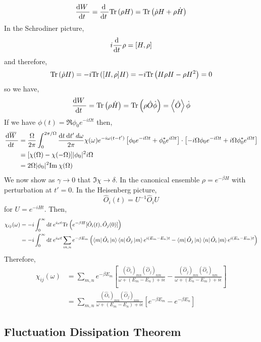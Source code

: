 \documentclass[12pt]{article}
\begin{document}
\[ \frac{\mathrm{d}W \:}{\mathrm{d}t \:} = \frac{\mathrm{d} \:}{\mathrm{d}t \:} \mathrm{Tr} \left( \rho H \right) = \mathrm{Tr} \left( \dot{\rho} H + \rho \dot{H} \right) \]
In the Schrodiner picture,
\[ i \frac{\mathrm{d} \:}{\mathrm{d}t \:} \rho = [H, \rho] \]
and therefore,
\[ \mathrm{Tr} \left( \dot{\rho} H \right) = - i \mathrm{Tr} \left( [H, \rho] H \right) = - i \mathrm{Tr} \left( H \rho H - \rho H^2 \right) = 0 \]
so we have,
\[ \frac{\mathrm{d}W \:}{\mathrm{d}t \:} = \mathrm{Tr} \left( \rho \dot{H} \right) = \mathrm{Tr} \left( \rho \hat{O} \dot{\phi} \right) = \left< \hat{O} \right> \dot{\phi} \]
If we have $\phi(t) = \Re{\phi_0 e^{- i \Omega t}}$ then,
\begin{align*}
\frac{\mathrm{d}\overline{W} \:}{\mathrm{d}t \:} & = \frac{\Omega}{2 \pi} \int_0^{2 \pi / \Omega} \frac{\mathrm{d}t \: \mathrm{d}t' \: d{\omega}}{2 \pi} \chi(\omega) e^{- i \omega (t - t')} \left[ \phi_0 e^{- i \Omega t} + \phi^*_0 e^{i \Omega t} \right] \cdot \left[ - i \Omega \phi_0 e^{- i \Omega t} + i \Omega \phi_0^* e^{i \Omega t} \right] 
\\
& = [ \chi(\Omega) - \chi(-\Omega) ] |\phi_0|^2 i \Omega
\\
& = 2 \Omega |\phi_0|^2 \mathrm{Im} \: \chi(\Omega) 
\end{align*}
We now show as $\gamma \to 0$ that $\Im{\chi} \to \delta$. In the canonical ensemble $\rho = e^{-\beta H}$ with perturbation at $t' = 0$. In the Heisenberg picture,
\[ \hat{O}_i(t) = U^{-1} \hat{O}_i U \]
for $U = e^{- i H t}$. Then,
\begin{align*}
\chi_{ij}(\omega) & = - i \int_0^{\infty} \mathrm{d}t \: e^{i \omega t} \mathrm{Tr} \left( e^{-\beta H} [\hat{O}_i(t), \hat{O}_j(0)] \right)
\\
& = - i \int_0^{\infty} \mathrm{d}t \: e^{i \omega t} \sum_{m,n} e^{-\beta E_m} \left( \left< m \right| \hat{O}_i \left| n \right> \left< n \right| \hat{O}_j \left| m \right> e^{i (E_m - E_n) t} - \left< m \right| \hat{O}_j \left| n \right> \left< n \right| \hat{O}_i \left| m \right> e^{i (E_n - E_m) t} \right) 
\end{align*}
Therefore,
\begin{align*}
\chi_{ij}(\omega) & = \sum_{m,n} e^{-\beta E_m} \left[ \frac{(\hat{O}_i)_{m n} (\hat{O}_j)_{n m}}{\omega + (E_m - E_n) + i \epsilon} - \frac{(\hat{O}_j)_{m n} (\hat{O}_i)_{n m}}{\omega + (E_n - E_m) + i \epsilon} \right]
\\
& = \sum_{m,n} \frac{(\hat{O}_i)_{m n} (\hat{O}_j)_{n m}}{\omega + (E_m - E_n) + i \epsilon} \left[ e^{- \beta E_m} - e^{- \beta E_n} \right]
\end{align*}

\subsection{Fluctuation Dissipation Theorem}
\end{document}
